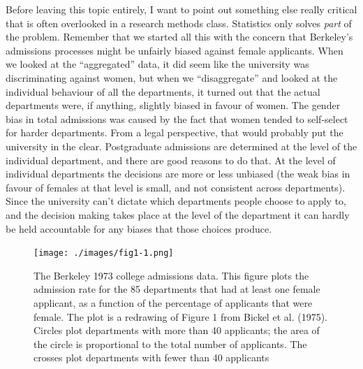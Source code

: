 \documentclass[
  letterpaper,
]{book}
\begin{document}
Before leaving this topic entirely, I want to point out something else
really critical that is often overlooked in a research methods class.
Statistics only solves \emph{part} of the problem. Remember that we
started all this with the concern that Berkeley's admissions processes
might be unfairly biased against female applicants. When we looked at
the ``aggregated'' data, it did seem like the university was
discriminating against women, but when we ``disaggregate'' and looked at
the individual behaviour of all the departments, it turned out that the
actual departments were, if anything, slightly biased in favour of
women. The gender bias in total admissions was caused by the fact that
women tended to self-select for harder departments. From a legal
perspective, that would probably put the university in the clear.
Postgraduate admissions are determined at the level of the individual
department, and there are good reasons to do that. At the level of
individual departments the decisions are more or less unbiased (the weak
bias in favour of females at that level is small, and not consistent
across departments). Since the university can't dictate which
departments people choose to apply to, and the decision making takes
place at the level of the department it can hardly be held accountable
for any biases that those choices produce.

\begin{figure}

\texttt{[image: ./images/fig1-1.png]} \hfill{}

\caption{\label{fig-fig1-1}The Berkeley 1973 college admissions data.
This figure plots the admission rate for the 85 departments that had at
least one female applicant, as a function of the percentage of
applicants that were female. The plot is a redrawing of Figure 1 from
Bickel et al. (1975). Circles plot departments with more than 40
applicants; the area of the circle is proportional to the total number
of applicants. The crosses plot departments with fewer than 40
applicants}

\end{figure}
\end{document}
